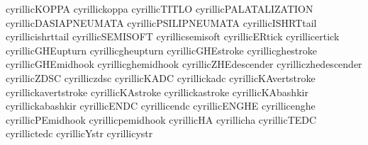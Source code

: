  cyrillicKOPPA              {}
 cyrillickoppa              {}
 cyrillicTITLO              {}
 cyrillicPALATALIZATION     {}
 cyrillicDASIAPNEUMATA      {}
 cyrillicPSILIPNEUMATA      {}
 cyrillicISHRTtail          {}
 cyrillicishrttail          {}
 cyrillicSEMISOFT           {}
 cyrillicsemisoft           {}
 cyrillicERtick             {}
 cyrillicertick             {}
 cyrillicGHEupturn          {}
 cyrillicgheupturn          {}
 cyrillicGHEstroke          {}
 cyrillicghestroke          {}
 cyrillicGHEmidhook         {}
 cyrillicghemidhook         {}
 cyrillicZHEdescender       {}
 cyrilliczhedescender       {}
 cyrillicZDSC               {}
 cyrilliczdsc               {}
 cyrillicKADC               {}
 cyrillickadc               {}
 cyrillicKAvertstroke       {}
 cyrillickavertstroke       {}
 cyrillicKAstroke           {}
 cyrillickastroke           {}
 cyrillicKAbashkir          {}
 cyrillickabashkir          {}
 cyrillicENDC               {}
 cyrillicendc               {}
 cyrillicENGHE              {}
 cyrillicenghe              {}
 cyrillicPEmidhook          {}
 cyrillicpemidhook          {}
 cyrillicHA                 {}
 cyrillicha                 {}
 cyrillicTEDC               {}
 cyrillictedc               {}
 cyrillicYstr               {}
 cyrillicystr               {}
